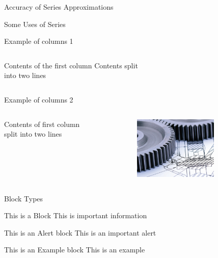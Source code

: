\documentclass{beamer}
\begin{document}
\begin{frame}{Accuracy of Series Approximations}
\end{frame}
  
\begin{frame}{Some Uses of Series}
\end{frame}

\begin{frame}{Example of columns 1}
    \begin{columns}[c] %
     Contents of the first column
     Contents split \\ into two lines
    \end{columns}
\end{frame}
 
\begin{frame}{Example of columns 2}
     \begin{columns}[t] %
     \begin{column}[T]{5cm} %
     Contents of first column \\ split into two lines
     \end{column}
     \begin{column}[T]{5cm} %
          \includegraphics[height=3cm]{images/engineering.jpg}
     \end{column}
     \end{columns}
\end{frame}

\begin{frame}{Block Types}
   \begin{block}{This is a Block}
      This is important information
   \end{block}
 
   \begin{alertblock}{This is an Alert block}
   This is an important alert
   \end{alertblock}
 
   \begin{exampleblock}{This is an Example block}
   This is an example 
   \end{exampleblock}
\end{frame}
\end{document}
